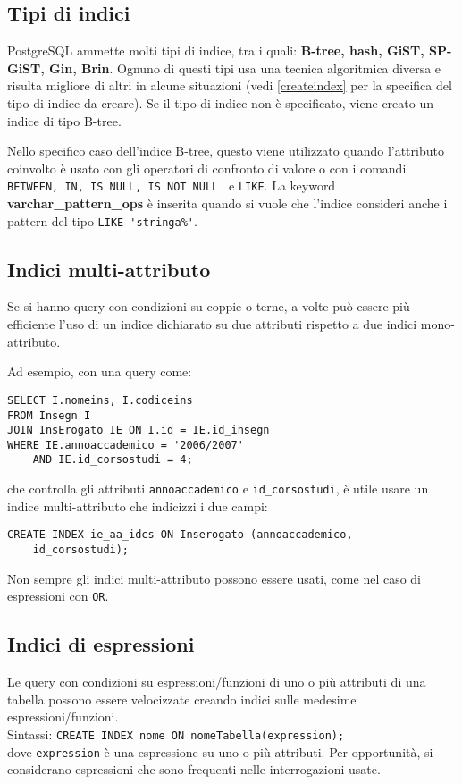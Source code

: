 \documentclass[a4paper, 10pt, titlepage]{article}
\begin{document}
	\subsection{Tipi di indici}
	PostgreSQL ammette molti tipi di indice, tra i quali: \textbf{B-tree, hash, GiST, SP-GiST, Gin, Brin}.
	Ognuno di questi tipi usa una tecnica algoritmica diversa e risulta migliore di altri in alcune situazioni (vedi \ref{createindex} per la specifica del tipo di indice da creare).
	Se il tipo di indice non è specificato, viene creato un indice di tipo B-tree.
	
	 Nello specifico caso dell'indice B-tree, questo viene utilizzato quando l'attributo coinvolto è usato con gli operatori di confronto di valore o con i comandi \lstinline|BETWEEN, IN, IS NULL, IS NOT NULL | e \lstinline|LIKE|.
	 La keyword \textbf{varchar\_pattern\_ops} è inserita quando si vuole che l'indice consideri anche i pattern del tipo \lstinline|LIKE 'stringa%'|.
	 
	 \subsection{Indici multi-attributo}
	 Se si hanno query con condizioni su coppie o terne, a volte può essere più efficiente l'uso di un indice dichiarato su due attributi rispetto a due indici mono-attributo.
	 
	 Ad esempio, con una query come:
	 \begin{lstlisting}
SELECT I.nomeins, I.codiceins
FROM Insegn I
JOIN InsErogato IE ON I.id = IE.id_insegn
WHERE IE.annoaccademico = '2006/2007'
	AND IE.id_corsostudi = 4;
	 \end{lstlisting}
	 che controlla gli attributi \verb|annoaccademico| e \verb|id_corsostudi|, è utile usare un indice multi-attributo che indicizzi i due campi:
	 \begin{lstlisting}
CREATE INDEX ie_aa_idcs ON Inserogato (annoaccademico,
	id_corsostudi);
	 \end{lstlisting}
	 Non sempre gli indici multi-attributo possono essere usati, come nel caso di espressioni con \lstinline|OR|.
	 
	 \subsection{Indici di espressioni}
	 Le query con condizioni su espressioni/funzioni di uno o più attributi di una tabella possono essere velocizzate creando indici sulle medesime espressioni/funzioni.\\
Sintassi: \lstinline|CREATE INDEX nome ON nomeTabella(expression);|\\
dove \lstinline|expression| è una espressione su uno o più attributi.
Per opportunità, si considerano espressioni che sono frequenti nelle interrogazioni usate.
\end{document}

